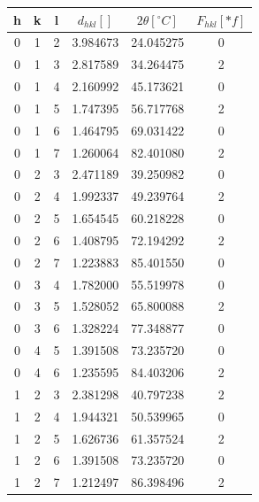 \documentclass[a4paper,10pt]{article}
\begin{document}
\begin{tabular}{|cccccc|}
\hline
\hline
  h &  k &  l &  $d_{hkl}[]$ &  $2\theta[^\circ C]$ &$F_{hkl}[*f]$ \\
\hline
\hline
  0 &  1 &  2 &     3.984673 &            24.045275 &            0 \\\hline
  0 &  1 &  3 &     2.817589 &            34.264475 &            2 \\\hline
  0 &  1 &  4 &     2.160992 &            45.173621 &            0 \\\hline
  0 &  1 &  5 &     1.747395 &            56.717768 &            2 \\\hline
  0 &  1 &  6 &     1.464795 &            69.031422 &            0 \\\hline
  0 &  1 &  7 &     1.260064 &            82.401080 &            2 \\\hline
  0 &  2 &  3 &     2.471189 &            39.250982 &            0 \\\hline
  0 &  2 &  4 &     1.992337 &            49.239764 &            2 \\\hline
  0 &  2 &  5 &     1.654545 &            60.218228 &            0 \\\hline
  0 &  2 &  6 &     1.408795 &            72.194292 &            2 \\\hline
  0 &  2 &  7 &     1.223883 &            85.401550 &            0 \\\hline
  0 &  3 &  4 &     1.782000 &            55.519978 &            0 \\\hline
  0 &  3 &  5 &     1.528052 &            65.800088 &            2 \\\hline
  0 &  3 &  6 &     1.328224 &            77.348877 &            0 \\\hline
  0 &  4 &  5 &     1.391508 &            73.235720 &            0 \\\hline
  0 &  4 &  6 &     1.235595 &            84.403206 &            2 \\\hline
  1 &  2 &  3 &     2.381298 &            40.797238 &            2 \\\hline
  1 &  2 &  4 &     1.944321 &            50.539965 &            0 \\\hline
  1 &  2 &  5 &     1.626736 &            61.357524 &            2 \\\hline
  1 &  2 &  6 &     1.391508 &            73.235720 &            0 \\\hline
  1 &  2 &  7 &     1.212497 &            86.398496 &            2 \\\hline

\end{tabular}
\end{document}
